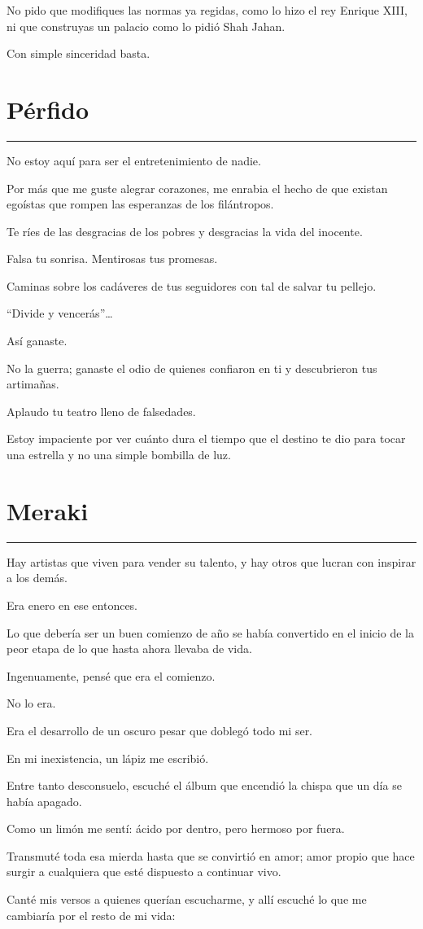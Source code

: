 \documentclass[12pt,oneside,a5paper]{book}
\newcommand{\poema}[1]{
    \clearpage
    \section*{#1}
    \vspace{-0.5em}
    {\color{black}\rule{\textwidth}{0.4pt}} \par \vspace{0.8em}
    \addcontentsline{toc}{section}{#1}
}
\begin{document}
No pido que modifiques las normas ya regidas, como lo hizo el rey Enrique XIII,
ni que construyas un palacio como lo pidió Shah Jahan.

Con simple sinceridad basta.

\poema{Pérfido}
No estoy aquí para ser el entretenimiento de nadie.

Por más que me guste alegrar corazones, me enrabia el hecho de que existan egoístas que rompen las esperanzas de los filántropos.

Te ríes de las desgracias de los pobres y desgracias la vida del inocente.

Falsa tu sonrisa. Mentirosas tus promesas.

Caminas sobre los cadáveres de tus seguidores con tal de salvar tu pellejo.

“Divide y vencerás”…

Así ganaste.

No la guerra; ganaste el odio de quienes confiaron en ti y descubrieron tus artimañas.

Aplaudo tu teatro lleno de falsedades.

Estoy impaciente por ver cuánto dura el tiempo que el destino te dio para tocar una estrella y no una simple bombilla de luz.

\poema{Meraki}
Hay artistas que viven para vender su talento, y hay otros que lucran con inspirar a los demás.

Era enero en ese entonces.

Lo que debería ser un buen comienzo de año se había convertido en el inicio de la peor etapa de lo que hasta ahora llevaba de vida.

Ingenuamente, pensé que era el comienzo.

No lo era.

Era el desarrollo de un oscuro pesar que doblegó todo mi ser.

En mi inexistencia, un lápiz me escribió.

Entre tanto desconsuelo, escuché el álbum que encendió la chispa que un día se había apagado.

Como un limón me sentí: ácido por dentro, pero hermoso por fuera.

Transmuté toda esa mierda hasta que se convirtió en amor; amor propio que hace surgir a cualquiera que esté dispuesto a continuar vivo.

Canté mis versos a quienes querían escucharme,
y allí escuché lo que me cambiaría por el resto de mi vida:
\end{document}
